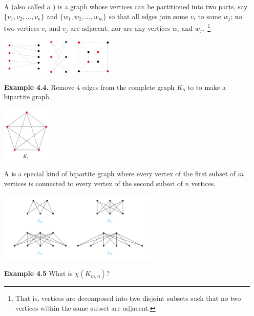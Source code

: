 \documentclass[aspectratio=169]{beamer}
\begin{document}
\begin{frame}[plain]{}
 
  A  (also called a )
   is a graph whose vertices can be partitioned into two
   parts, say $\{v_1, v_2,..., v_n\}$ and $\{w_1, w_2,..., w_m\}$
    so that all edges join some $v_i$ to some $w_j$;
    no two vertices $v_i$ and $v_j$ are adjacent, 
    nor are any vertices $w_i$ and $w_j$.~\footnote{That is,
    vertices are decomposed into two disjoint subsets 
    such that no two vertices within the same subset are adjacent.}
    
    
     
    \begin{center}
         \includegraphics[height=1.8cm]{./img/lecture4-fig4.png}
       \end{center}
       \pause
       
  {\bf Example 4.4.} Remove 4 edges from the complete graph $K_5$ to
     to  make a bipartite graph.
 
  \begin{center}
    \includegraphics[height=2.8cm]{./img/lecture4-fig5.png}
  \end{center}
   
  
 \end{frame}
 
 
 
 \begin{frame}[plain]{}
 
  A  is
  a special kind of bipartite graph where every vertex of the first subset
  of $m$ vertices is connected 
  to every vertex of the second subset of $n$ vertices.  
  \begin{center}
         \includegraphics[height=3.5cm]{./img/lecture4-fig6.png}
       \end{center}
  
 {\bf Example 4.5} What is $\chi(K_{m,n})$? %
\vspace{.3in}

\end{frame}
\end{document}
